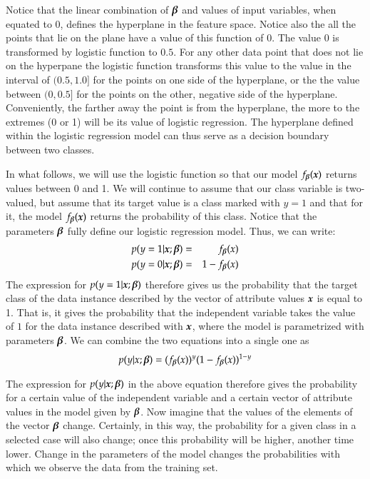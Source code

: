 \begin{refsection}
Notice that the linear combination of $\boldsymbol{\beta}$ and values of input variables, when equated to $0$, defines the hyperplane in the feature space. Notice also the all the points that lie on the plane have a value of this function of $0$. The value $0$ is transformed by logistic function to $0.5$. For any other data point that does not lie on the hyperpane the logistic function transforms this value to the value in the interval of $(0.5, 1.0]$ for the points on one side of the hyperplane, or the the value between $(0, 0.5]$ for the points on the other, negative side of the hyperplane. Conveniently, the farther away the point is from the hyperplane, the more to the extremes (0 or 1) will be its value of logistic regression. The hyperplane defined within the logistic regression model can thus serve as a decision boundary between two classes.

In what follows, we will use the logistic function so that our model $f_{\boldsymbol{\beta}}(\boldsymbol{x})$ returns values between 0 and 1. We will continue to assume that our class variable is two-valued, but assume that its target value is a class marked with $y=1$ and that for it, the model $f_{\boldsymbol{\beta}} (\boldsymbol{x})$ returns the probability of this class. Notice that the parameters $\boldsymbol{\beta}$ fully define our logistic regression model. Thus, we can write:
\begin{eqnarray}
  p(y=1|\boldsymbol{x};\boldsymbol{\beta}) & = & f_{\boldsymbol{\beta}}(x) \\
  p(y=0|\boldsymbol{x};\boldsymbol{\beta}) & = & 1-f_{\boldsymbol{\beta}}(x)
\end{eqnarray}
The expression for $p(y=1|\boldsymbol{x};\boldsymbol{\beta}) $ therefore gives us the probability that the target class of the data instance described by the vector of attribute values $\boldsymbol{x}$ is equal to 1. That is, it gives the probability that the independent variable takes the value of $1$ for the data instance described with $\boldsymbol{x}$, where the model is parametrized with parameters $\boldsymbol{\beta}$. We can combine the two equations into a single one as
\begin{equation}
  p(y|x;\boldsymbol{\beta}) = (f_{\boldsymbol{\beta}}(x))^y(1-f_{\boldsymbol{\beta}}(x))^{1-y}
\label{eq:log-prob}
\end{equation}

The expression for $p(y|\boldsymbol{x};\boldsymbol{\beta}) $ in the above equation therefore gives the probability for a certain value of the independent variable and a certain vector of attribute values in the model given by $\boldsymbol{\beta}$. Now imagine that the values of the elements of the vector $\boldsymbol{\beta}$ change. Certainly, in this way, the probability for a given class in a selected case will also change; once this probability will be higher, another time lower. Change in the parameters of the model changes the probabilities with which we observe the data from the training set.


\end{refsection}
